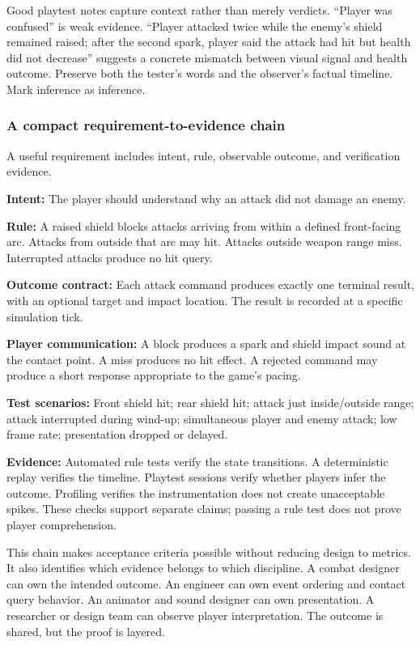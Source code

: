 Good playtest notes capture context rather than merely verdicts. ``Player was confused'' is weak evidence. ``Player attacked twice while the enemy's shield remained raised; after the second spark, player said the attack had hit but health did not decrease'' suggests a concrete mismatch between visual signal and health outcome. Preserve both the tester's words and the observer's factual timeline. Mark inference as inference.

\subsubsection{A compact requirement-to-evidence chain}\label{a-compact-requirement-to-evidence-chain}

A useful requirement includes intent, rule, observable outcome, and verification evidence.

\textbf{Intent:} The player should understand why an attack did not damage an enemy.

\textbf{Rule:} A raised shield blocks attacks arriving from within a defined front-facing arc. Attacks from outside that arc may hit. Attacks outside weapon range miss. Interrupted attacks produce no hit query.

\textbf{Outcome contract:} Each attack command produces exactly one terminal result, with an optional target and impact location. The result is recorded at a specific simulation tick.

\textbf{Player communication:} A block produces a spark and shield impact sound at the contact point. A miss produces no hit effect. A rejected command may produce a short response appropriate to the game's pacing.

\textbf{Test scenarios:} Front shield hit; rear shield hit; attack just inside/outside range; attack interrupted during wind-up; simultaneous player and enemy attack; low frame rate; presentation dropped or delayed.

\textbf{Evidence:} Automated rule tests verify the state transitions. A deterministic replay verifies the timeline. Playtest sessions verify whether players infer the outcome. Profiling verifies the instrumentation does not create unacceptable spikes. These checks support separate claims; passing a rule test does not prove player comprehension.

This chain makes acceptance criteria possible without reducing design to metrics. It also identifies which evidence belongs to which discipline. A combat designer can own the intended outcome. An engineer can own event ordering and contact query behavior. An animator and sound designer can own presentation. A researcher or design team can observe player interpretation. The outcome is shared, but the proof is layered.

